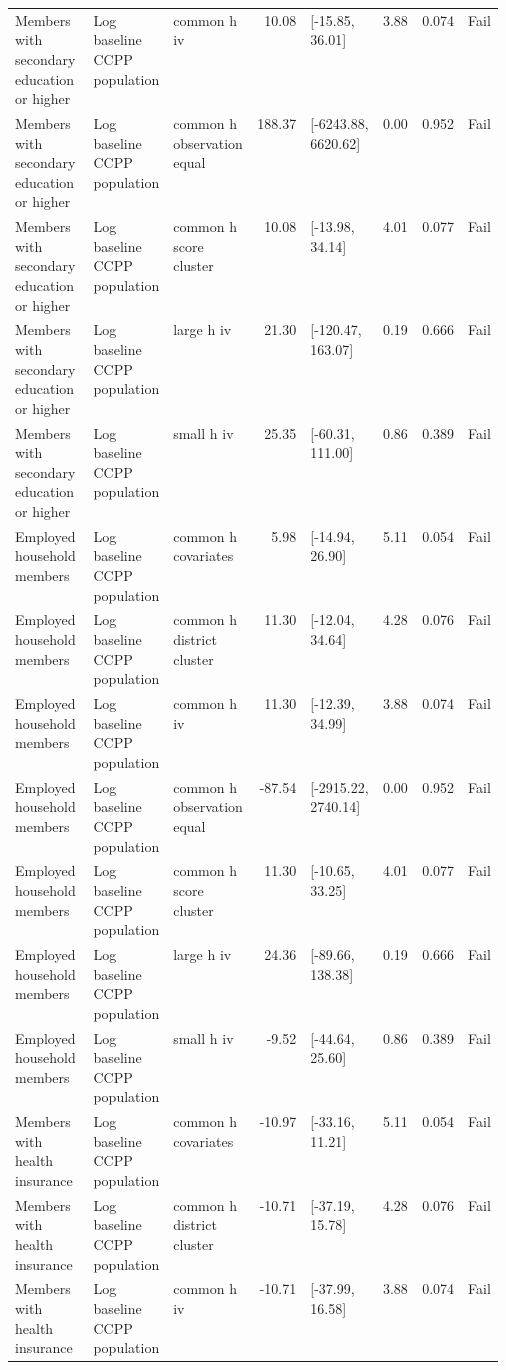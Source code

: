 \begin{longtable}{@{}p{0.16\linewidth}p{0.14\linewidth}p{0.14\linewidth}rp{0.13\linewidth}rrl@{}}
Members with secondary education or higher & Log baseline CCPP population & common h iv & 10.08 & [-15.85, 36.01] & 3.88 & 0.074 & Fail \\
Members with secondary education or higher & Log baseline CCPP population & common h observation equal & 188.37 & [-6243.88, 6620.62] & 0.00 & 0.952 & Fail \\
Members with secondary education or higher & Log baseline CCPP population & common h score cluster & 10.08 & [-13.98, 34.14] & 4.01 & 0.077 & Fail \\
Members with secondary education or higher & Log baseline CCPP population & large h iv & 21.30 & [-120.47, 163.07] & 0.19 & 0.666 & Fail \\
Members with secondary education or higher & Log baseline CCPP population & small h iv & 25.35 & [-60.31, 111.00] & 0.86 & 0.389 & Fail \\
Employed household members & Log baseline CCPP population & common h covariates & 5.98 & [-14.94, 26.90] & 5.11 & 0.054 & Fail \\
Employed household members & Log baseline CCPP population & common h district cluster & 11.30 & [-12.04, 34.64] & 4.28 & 0.076 & Fail \\
Employed household members & Log baseline CCPP population & common h iv & 11.30 & [-12.39, 34.99] & 3.88 & 0.074 & Fail \\
Employed household members & Log baseline CCPP population & common h observation equal & -87.54 & [-2915.22, 2740.14] & 0.00 & 0.952 & Fail \\
Employed household members & Log baseline CCPP population & common h score cluster & 11.30 & [-10.65, 33.25] & 4.01 & 0.077 & Fail \\
Employed household members & Log baseline CCPP population & large h iv & 24.36 & [-89.66, 138.38] & 0.19 & 0.666 & Fail \\
Employed household members & Log baseline CCPP population & small h iv & -9.52 & [-44.64, 25.60] & 0.86 & 0.389 & Fail \\
Members with health insurance & Log baseline CCPP population & common h covariates & -10.97 & [-33.16, 11.21] & 5.11 & 0.054 & Fail \\
Members with health insurance & Log baseline CCPP population & common h district cluster & -10.71 & [-37.19, 15.78] & 4.28 & 0.076 & Fail \\
Members with health insurance & Log baseline CCPP population & common h iv & -10.71 & [-37.99, 16.58] & 3.88 & 0.074 & Fail \\

\end{longtable}
